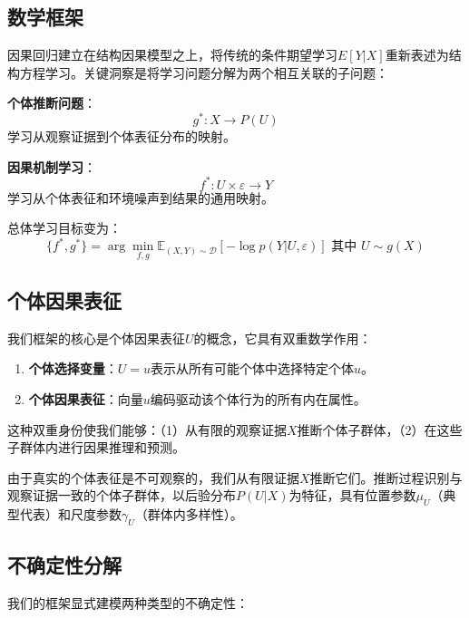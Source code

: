 \documentclass[conference]{IEEEtran}
\newcommand{\expectation}{\mathbb{E}}
\begin{document}
\begin{CJK}{UTF8}{gbsn}
\subsection{数学框架}

因果回归建立在结构因果模型之上，将传统的条件期望学习$E[Y|X]$重新表述为结构方程学习。关键洞察是将学习问题分解为两个相互关联的子问题：

\textbf{个体推断问题}：
\begin{equation}
g^*: X \rightarrow P(U)
\end{equation}
学习从观察证据到个体表征分布的映射。

\textbf{因果机制学习}：
\begin{equation}
f^*: U \times \varepsilon \rightarrow Y  
\end{equation}
学习从个体表征和环境噪声到结果的通用映射。

总体学习目标变为：
\begin{equation}
\{f^*, g^*\} = \arg\min_{f,g} \expectation_{(X,Y) \sim \mathcal{D}}[-\log p(Y|U,\varepsilon)] \text{ 其中 } U \sim g(X)
\end{equation}

\subsection{个体因果表征}

我们框架的核心是个体因果表征$U$的概念，它具有双重数学作用：

\begin{enumerate}
\item \textbf{个体选择变量}：$U = u$表示从所有可能个体中选择特定个体$u$。

\item \textbf{个体因果表征}：向量$u$编码驱动该个体行为的所有内在属性。
\end{enumerate}

这种双重身份使我们能够：（1）从有限的观察证据$X$推断个体子群体，（2）在这些子群体内进行因果推理和预测。

由于真实的个体表征是不可观察的，我们从有限证据$X$推断它们。推断过程识别与观察证据一致的个体子群体，以后验分布$P(U|X)$为特征，具有位置参数$\mu_U$（典型代表）和尺度参数$\gamma_U$（群体内多样性）。

\subsection{不确定性分解}

我们的框架显式建模两种类型的不确定性：


\end{CJK}
\end{document}

